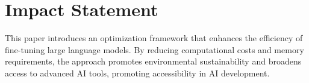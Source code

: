 \section*{Impact Statement}
This paper introduces an optimization framework that enhances the efficiency of fine-tuning large language models. By reducing computational costs and memory requirements, the approach promotes environmental sustainability and broadens access to advanced AI tools, promoting accessibility in AI development. 